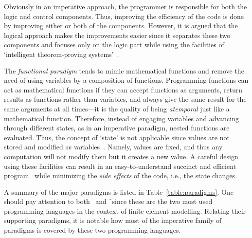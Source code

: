 	Obviously in an imperative approach, the programmer is responsible for both the logic and control components. Thus, improving the efficiency of the code is done by improving either or both of the components. However, it is argued that the logical approach makes the improvements easier since it separates these two components and focuses only on the logic part while using the facilities of `intelligent theorem-proving systems'~\autocite{Kowalski.1979}.
		
	The \textit{functional paradigm} tends to mimic mathematical functions and remove the need of using variables by a composition of functions. Programming functions can act as mathematical functions if they can accept functions as arguments, return results as functions rather than variables, and always give the same result for the same arguments at all times---it is the quality of being \textit{atemporal} just like a mathematical function. Therefore, instead of engaging variables and advancing through different states, as in an imperative paradigm, nested functions are evaluated. Thus, the concept of `state' is not applicable since values are not stored and modified as variables~\autocite{Budd.1995}. Namely, values are fixed, and thus any computation will not modify them but it creates a new value. A careful design using these facilities can result in an easy-to-understand succinct and efficient program~\autocite{Lott.2015} while minimizing the \textit{side effects} of the code, i.e., the state changes.

	A summary of the major paradigms is listed in Table~\ref{table:paradigms}. One should pay attention to both \py\ and \f\ since these are the two most used programming languages in the context of finite element modelling. Relating their supporting paradigms, it is notable how most of the imperative family of paradigms is covered by these two programming languages.
		

